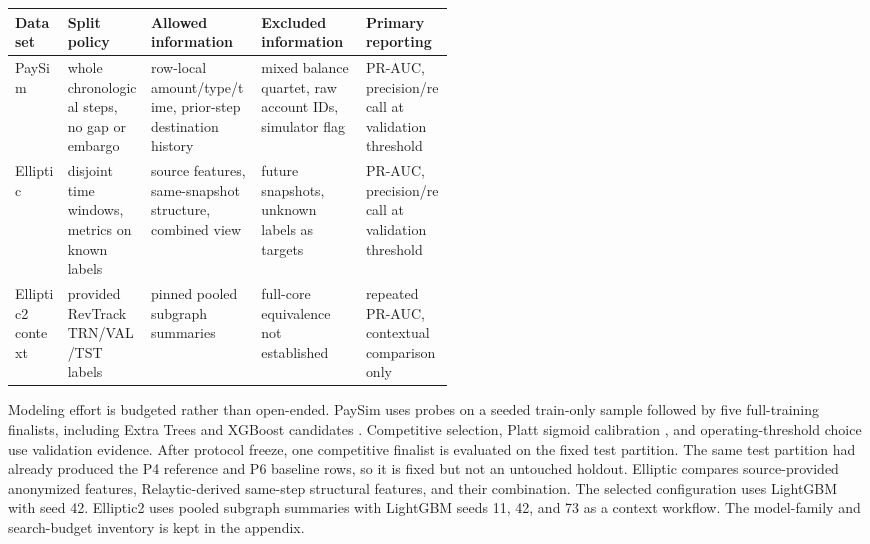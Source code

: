 \documentclass[11pt]{article}
\begin{document}
\begin{center}
\begin{minipage}{\linewidth}
\scriptsize
\setlength{\tabcolsep}{3pt}
\renewcommand{\arraystretch}{1.16}
\begin{tabularx}{\linewidth}{@{}>{\raggedright\arraybackslash}p{0.12\linewidth} >{\raggedright\arraybackslash}p{0.19\linewidth} >{\raggedright\arraybackslash}X >{\raggedright\arraybackslash}X >{\raggedright\arraybackslash}p{0.20\linewidth}@{}}
\toprule
Dataset & Split policy & Allowed information & Excluded information & Primary reporting \\
\midrule
PaySim & whole chronological steps, no gap or embargo & row-local amount/type/time, prior-step destination history & mixed balance quartet, raw account IDs, simulator flag & PR-AUC, precision/recall at validation threshold \\
Elliptic & disjoint time windows, metrics on known labels & source features, same-snapshot structure, combined view & future snapshots, unknown labels as targets & PR-AUC, precision/recall at validation threshold \\
Elliptic2 context & provided RevTrack TRN/VAL/TST labels & pinned pooled subgraph summaries & full-core equivalence not established & repeated PR-AUC, contextual comparison only \\
\bottomrule
\end{tabularx}
\end{minipage}
\end{center}


Modeling effort is budgeted rather than open-ended. PaySim uses probes on a seeded train-only sample followed by five full-training finalists, including Extra Trees and XGBoost candidates \citep{geurts2006extratrees,chen2016xgboost}. Competitive selection, Platt sigmoid calibration \citep{platt1999probabilistic}, and operating-threshold choice use validation evidence. After protocol freeze, one competitive finalist is evaluated on the fixed test partition. The same test partition had already produced the P4 reference and P6 baseline rows, so it is fixed but not an untouched holdout. Elliptic compares source-provided anonymized features, Relaytic-derived same-step structural features, and their combination. The selected configuration uses LightGBM \citep{ke2017lightgbm} with seed 42. Elliptic2 uses pooled subgraph summaries with LightGBM seeds 11, 42, and 73 as a context workflow. The model-family and search-budget inventory is kept in the appendix.
\end{document}
